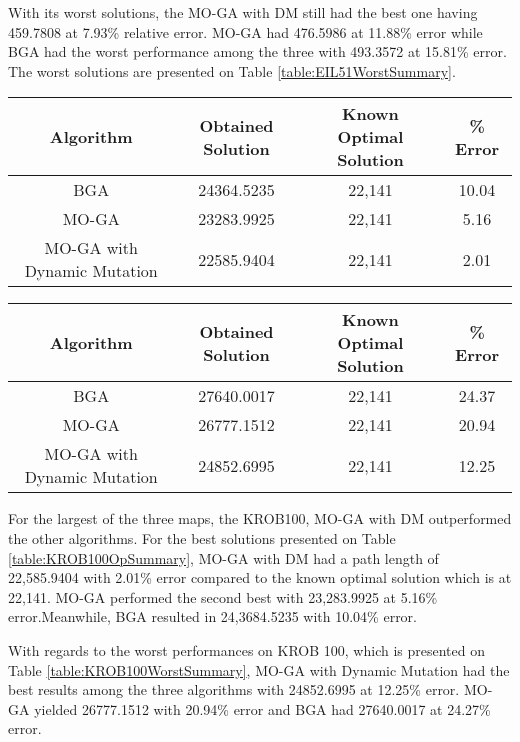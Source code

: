 With its worst solutions, the MO-GA with DM still had the best one having 459.7808 at 7.93\% relative error. MO-GA had 476.5986 at 11.88\% error while BGA had the worst performance among the three with 493.3572 at 15.81\% error. The worst solutions are presented on Table \ref{table:EIL51WorstSummary}.

\begin{table*}[h]
	\begin{center}
		\begin{tabular}{ c c c c }
			Algorithm& Obtained Solution & Known Optimal Solution&\% Error\\ 
			\hline
			BGA & 24364.5235 & 22,141 & 10.04  \\
			MO-GA & 23283.9925  & 22,141& 5.16  \\
			MO-GA with Dynamic Mutation & 22585.9404  & 22,141& 2.01 \\
		\end{tabular}
		\caption{The comparison of the obtained best optimum solutions for KROB100.}
		\label{table:KROB100OpSummary}
	\end{center}
\end{table*}

\begin{table*}[h]
	\begin{center}
		\begin{tabular}{ c c c c }
			Algorithm& Obtained Solution & Known Optimal Solution&\% Error\\ 
			\hline
			BGA & 27640.0017  & 22,141& 24.37  \\
			MO-GA & 26777.1512  & 22,141& 20.94  \\
			MO-GA with Dynamic Mutation & 24852.6995  & 22,141& 12.25 \\
		\end{tabular}
		\caption{The comparison of the obtained worst optimum solutions for KROB100.}
		\label{table:KROB100WorstSummary}
	\end{center}
\end{table*}

For the largest of the three maps, the KROB100, MO-GA with DM outperformed the other algorithms. For the best solutions presented on Table \ref{table:KROB100OpSummary}, MO-GA with DM had a path length of 22,585.9404 with 2.01\% error compared to the known optimal solution which is at 22,141. MO-GA performed the second best with 23,283.9925 at 5.16\% error.Meanwhile, BGA resulted in 24,3684.5235 with 10.04\% error.

With regards to the worst performances on KROB 100, which is presented on Table \ref{table:KROB100WorstSummary}, MO-GA with Dynamic Mutation had the best results among the three algorithms with 24852.6995 at 12.25\% error. MO-GA yielded 26777.1512 with 20.94\% error and BGA had 27640.0017 at 24.27\% error.


